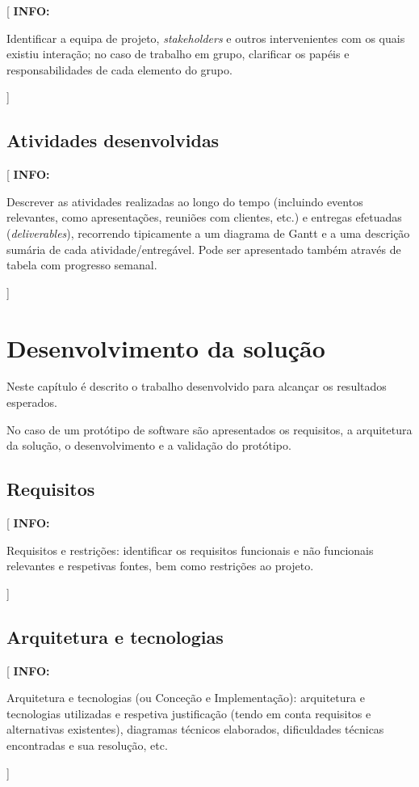 \documentclass[11pt,a4paper]{report}
\newenvironment{info}[1]{\vspace*{6mm}\color{blue}
                            [ \textbf{INFO:} \begin{em} #1}
                        {\vspace*{3mm}\end{em} ]}
\begin{document}
\begin{info}
Identificar a equipa de projeto, \emph{stakeholders} e outros
intervenientes com os quais existiu interação; no caso de trabalho em
grupo, clarificar os papéis e responsabilidades de cada elemento do grupo.
\end{info}

\section{Atividades desenvolvidas}

\begin{info}
Descrever as atividades realizadas ao longo do tempo (incluindo
eventos relevantes, como apresentações, reuniões com clientes, etc.)
e entregas efetuadas (\emph{deliverables}), recorrendo tipicamente a
um diagrama de Gantt e a uma descrição sumária de cada
atividade/entregável.
Pode ser apresentado também através de tabela com progresso semanal.
\end{info}


\chapter{Desenvolvimento da solução}

Neste capítulo é descrito o trabalho desenvolvido para alcançar os
resultados esperados.

No caso de um protótipo de software são apresentados os requisitos, a
arquitetura da solução, o desenvolvimento e a validação do protótipo.

\section{Requisitos}

\begin{info}
Requisitos e restrições: identificar os requisitos funcionais e não
funcionais relevantes e respetivas fontes, bem como restrições ao projeto. 
\end{info}

\section{Arquitetura e tecnologias}

\begin{info}
Arquitetura e tecnologias (ou Conceção e Implementação): arquitetura e
tecnologias utilizadas e respetiva justificação (tendo em conta
requisitos e alternativas existentes), diagramas técnicos elaborados,
dificuldades técnicas encontradas e sua resolução, etc. 
\end{info}
\end{document}
